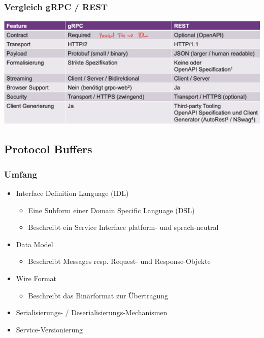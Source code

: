 \subsubsection{Vergleich gRPC / REST}
\begin{center}
    \includegraphics[scale=.3]{graphic/gprc/Vergleich gRPC REST.png}
\end{center}
\vspace{-8pt}

\subsection{Protocol Buffers}
\subsubsection{Umfang}
\begin{itemize}
    \item Interface Definition Language (IDL)
    \begin{itemize}
        \item Eine Subform einer Domain Specific Language (DSL)
        \item Beschreibt ein Service Interface platform- und sprach-neutral
    \end{itemize}
    \item Data Model
    \begin{itemize}
        \item Beschreibt Messages resp. Request- und Response-Objekte
    \end{itemize}
    \item Wire Format
    \begin{itemize}
        \item Beschreibt das Binärformat zur Übertragung
    \end{itemize}
    \item Serialisierungs- / Deserialisierungs-Mechanismen
    \item Service-Versionierung
\end{itemize}

